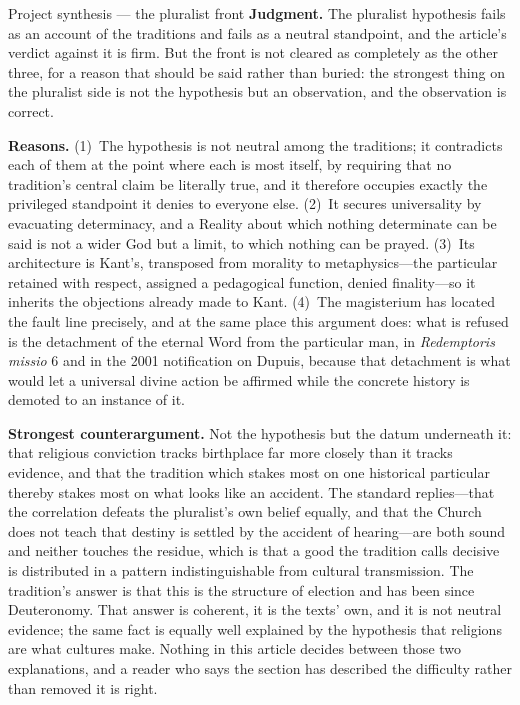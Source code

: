 \begin{studybox}{Project synthesis --- the pluralist front}
\textbf{Judgment.} The pluralist hypothesis fails as an account of the traditions and fails as a neutral standpoint, and the article's verdict against it is firm. But the front is not cleared as completely as the other three, for a reason that should be said rather than buried: the strongest thing on the pluralist side is not the hypothesis but an observation, and the observation is correct.

\textbf{Reasons.} (1)~The hypothesis is not neutral among the traditions; it contradicts each of them at the point where each is most itself, by requiring that no tradition's central claim be literally true, and it therefore occupies exactly the privileged standpoint it denies to everyone else. (2)~It secures universality by evacuating determinacy, and a Reality about which nothing determinate can be said is not a wider God but a limit, to which nothing can be prayed. (3)~Its architecture is Kant's, transposed from morality to metaphysics---the particular retained with respect, assigned a pedagogical function, denied finality---so it inherits the objections already made to Kant. (4)~The magisterium has located the fault line precisely, and at the same place this argument does: what is refused is the detachment of the eternal Word from the particular man, in \emph{Redemptoris missio} 6 and in the 2001 notification on Dupuis, because that detachment is what would let a universal divine action be affirmed while the concrete history is demoted to an instance of it.

\textbf{Strongest counterargument.} Not the hypothesis but the datum underneath it: that religious conviction tracks birthplace far more closely than it tracks evidence, and that the tradition which stakes most on one historical particular thereby stakes most on what looks like an accident. The standard replies---that the correlation defeats the pluralist's own belief equally, and that the Church does not teach that destiny is settled by the accident of hearing---are both sound and neither touches the residue, which is that a good the tradition calls decisive is distributed in a pattern indistinguishable from cultural transmission. The tradition's answer is that this is the structure of election and has been since Deuteronomy. That answer is coherent, it is the texts' own, and it is not neutral evidence; the same fact is equally well explained by the hypothesis that religions are what cultures make. Nothing in this article decides between those two explanations, and a reader who says the section has described the difficulty rather than removed it is right.


\end{studybox}
